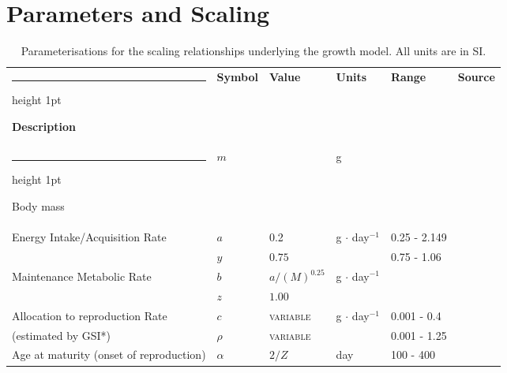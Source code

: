 \documentclass[a4paper]{article} %
\makeatletter
\newcommand{\thickhline}{%
    \noalign {\ifnum 0=`}\fi \hrule height 1pt
    \futurelet \reserved@a \@xhline
}
\makeatother
\begin{document}
\section{Parameters and Scaling}
\begin{table}[H]
    \caption{Parameterisations for the scaling relationships underlying the growth model. All units are in SI.}
    \begin{tabularx}{\linewidth}{Xlllll}
    \thickhline
    \textbf{Description}                        & \textbf{Symbol}       & \textbf{Value}            & \textbf{Units}        & \textbf{Range}                    & \textbf{Source}       \\ \thickhline
    Body mass                                   & $m$                   &                           & g                     &                                   &                       \\ \hline
    Energy Intake/Acquisition Rate              & $a$                   & 0.2                       & g $\cdot$ day$^{-1}$  & 0.25 - 2.149                      & \cite{West2001}       \\ 
                                                & $y$                   & $0.75$                    & \textsc{}             & 0.75 - 1.06                       & \cite{Pawar2012}      \\ \hline
    Maintenance Metabolic Rate                  & $b$                   & $a/(M)^{0.25}$            & g $\cdot$ day$^{-1}$  &                                   & \cite{West2001}       \\ 
                                                & $z$                   & $1.00$                    & \textsc{}             &                                   &                       \\ \hline
    Allocation to reproduction Rate             & $c$                   & \textsc{variable}         & g $\cdot$ day$^{-1}$  & 0.001 - 0.4                       & \cite{Charnov2001}    \\  %
    (estimated by GSI*)                         & $\rho$                & \textsc{variable}         & \textsc{}             & 0.001 - 1.25                      & \cite{Barneche2018d}                      \\ \hline %
    Age at maturity (onset of reproduction)     & $\alpha$              & $2/Z$                     & day                   & 100 - 400                         &                       \\ \hline

\end{tabularx}
\end{table}
\end{document}
